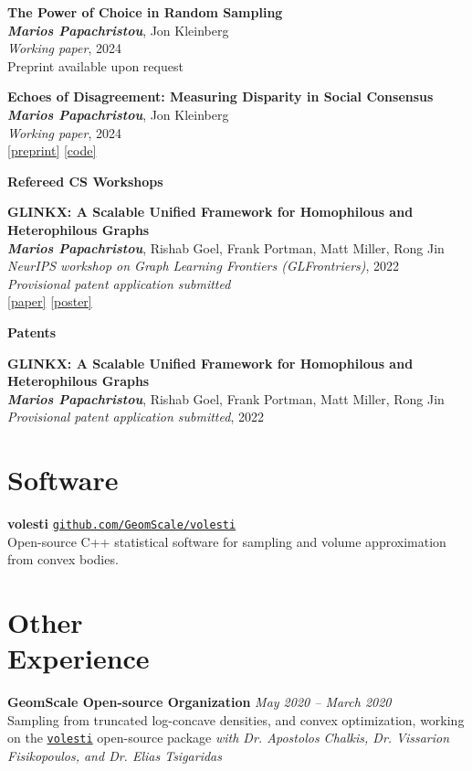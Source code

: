 \documentclass[margin]{res}
\newcommand{\field}[2]{\noindent \textbf{#1} \hfill #2 \\}
\newcommand{\specialurl}[2]{\href {#2} {{{[#1]}}}}
\newcommand{\preprint}[1]{\specialurl {preprint} {#1}}
\newcommand{\code}[1]{\specialurl {code} {#1}}
\newcommand{\poster}[1]{\specialurl {poster} {#1}}
\newcommand{\paper}[1]{\specialurl {paper} {#1}}
\newcommand{\authorref}[1]{{\textit{\textbf{#1}}}}
\newcommand{\authorme}{\authorref{Marios Papachristou}}
\newcommand{\publication}[5]{\textbf{#1}\\{#2}\\\emph{#3}, {#4}\\{#5}\smallskip}
\begin{document}
\begin{resume}
{\begin{enumerate}[nosep, label={[WP\arabic*]}]
   	\item \publication{The Power of Choice in Random Sampling}{\authorme, Jon Kleinberg}{Working paper}{2024}{Preprint available upon request}
   
   	\item \publication{Echoes of Disagreement: Measuring Disparity in Social Consensus}{\authorme, Jon Kleinberg}{Working paper}{2024}{\preprint{https://arxiv.org/abs/2504.07480} \code{https://github.com/papachristoumarios/disparity-optimization}}
    \end{enumerate}}


\field{Refereed CS Workshops}{}{
\begin{enumerate}[nosep, label={[W\arabic*]}]  
	\item \publication{GLINKX: A Scalable Unified Framework for Homophilous and Heterophilous Graphs}{\authorme, Rishab Goel, Frank Portman, Matt Miller, Rong Jin}{NeurIPS workshop on Graph Learning Frontiers (GLFrontriers)}{2022}{\emph{Provisional patent application submitted} \\ \paper{https://openreview.net/forum?id=GlViaJSwnlK} \poster{https://drive.google.com/file/d/14LwkvoH7sUe6qGvINGqTuMSHid16J3Av/view?usp=share_link}}
\end{enumerate}}

\field{Patents}{}{
\begin{enumerate}[nosep, label={[P\arabic*]}]  
	\item \publication{GLINKX: A Scalable Unified Framework for Homophilous and Heterophilous Graphs}{\authorme, Rishab Goel, Frank Portman, Matt Miller, Rong Jin}{Provisional patent application submitted}{2022}{}
\end{enumerate}}

\section{Software} \field{volesti}{\href{https://github.com/GeomScale/volesti}{\texttt{github.com/GeomScale/volesti}}}{Open-source C++ statistical software for sampling and volume approximation from convex bodies.}



\section{Other \\ Experience}


\field{GeomScale Open-source Organization}{\emph{May 2020 -- March 2020}}{Sampling from truncated log-concave densities, and convex optimization, working on the \href{https://github.com/GeomScale/volesti}{\texttt{volesti}} open-source package \emph{with Dr. Apostolos Chalkis, Dr. Vissarion Fisikopoulos, and Dr. Elias Tsigaridas}}


\end{resume}
\end{document}
